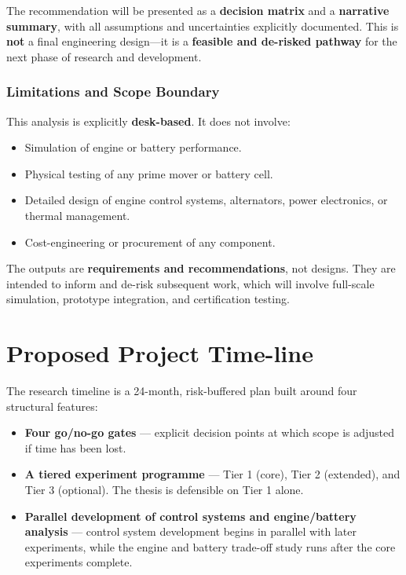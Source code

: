 \documentclass[12pt]{article}
\begin{document}
The recommendation will be presented as a \textbf{decision matrix} and a \textbf{narrative summary}, with all assumptions and uncertainties explicitly documented. This is \textbf{not} a final engineering design—it is a \textbf{feasible and de-risked pathway} for the next phase of research and development.

\subsubsection*{Limitations and Scope Boundary}

This analysis is explicitly \textbf{desk-based}. It does not involve:
\begin{itemize}
    \item Simulation of engine or battery performance.
    \item Physical testing of any prime mover or battery cell.
    \item Detailed design of engine control systems, alternators, power electronics, or thermal management.
    \item Cost-engineering or procurement of any component.
\end{itemize}

The outputs are \textbf{requirements and recommendations}, not designs. They are intended to inform and de-risk subsequent work, which will involve full-scale simulation, prototype integration, and certification testing.

\break

\section{Proposed Project Time-line}

The research timeline is a 24-month, risk-buffered plan built around four
structural features:

\begin{itemize}
    \item \textbf{Four go/no-go gates} --- explicit decision points at which scope is adjusted
          if time has been lost.
    \item \textbf{A tiered experiment programme} --- Tier 1 (core), Tier 2 (extended), and
          Tier 3 (optional). The thesis is defensible on Tier 1 alone.
    \item \textbf{Parallel development of control systems and engine/battery analysis} ---
          control system development begins in parallel with later experiments, while
          the engine and battery trade-off study runs after the core experiments
          complete.
\end{itemize}
\end{document}
